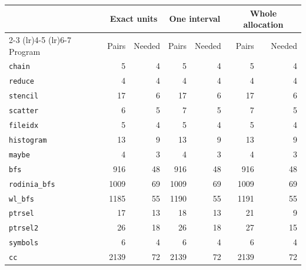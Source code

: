 \begin{tabular}{lrrrrrr}
\toprule
 & \multicolumn{2}{c}{Exact units} & \multicolumn{2}{c}{One interval} & \multicolumn{2}{c}{Whole allocation} \\
\cmidrule(lr){2-3} \cmidrule(lr){4-5} \cmidrule(lr){6-7}
Program & Pairs & Needed & Pairs & Needed & Pairs & Needed \\
\midrule
\texttt{chain} & 5 & 4 & 5 & 4 & 5 & 4 \\
\texttt{reduce} & 4 & 4 & 4 & 4 & 4 & 4 \\
\texttt{stencil} & 17 & 6 & 17 & 6 & 17 & 6 \\
\texttt{scatter} & 6 & 5 & 7 & 5 & 7 & 5 \\
\texttt{fileidx} & 5 & 4 & 5 & 4 & 5 & 4 \\
\texttt{histogram} & 13 & 9 & 13 & 9 & 13 & 9 \\
\texttt{maybe} & 4 & 3 & 4 & 3 & 4 & 3 \\
\texttt{bfs} & 916 & 48 & 916 & 48 & 916 & 48 \\
\texttt{rodinia\_bfs} & 1009 & 69 & 1009 & 69 & 1009 & 69 \\
\texttt{wl\_bfs} & 1185 & 55 & 1190 & 55 & 1191 & 55 \\
\texttt{ptrsel} & 17 & 13 & 18 & 13 & 21 & 9 \\
\texttt{ptrsel2} & 26 & 18 & 26 & 18 & 27 & 15 \\
\texttt{symbols} & 6 & 4 & 6 & 4 & 6 & 4 \\
\texttt{cc} & 2139 & 72 & 2139 & 72 & 2139 & 72 \\
\bottomrule
\end{tabular}
